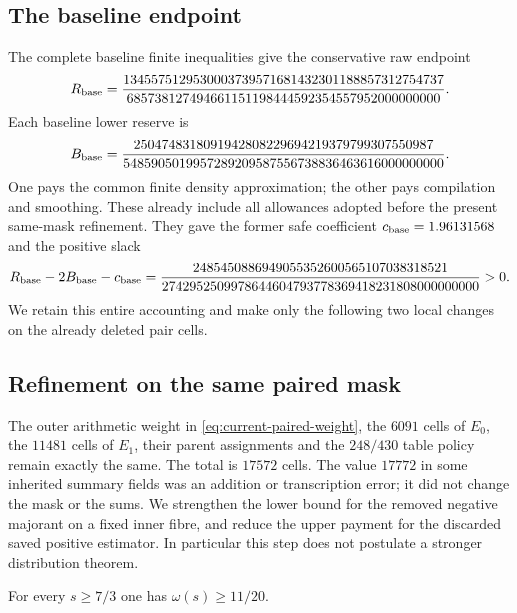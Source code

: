 \subsection{The baseline endpoint}

The complete baseline finite inequalities give the conservative raw endpoint
\begin{equation}
 R_{\rm base}=
 \frac{1345575129530003739571681432301188857312754737}
      {685738127494661151198444592354557952000000000}.
 \label{eq:base-R}
\end{equation}
Each baseline lower reserve is
\begin{equation}
 B_{\rm base}=
 \frac{2504748318091942808229694219379799307550987}
      {5485905019957289209587556738836463616000000000}.
 \label{eq:base-B}
\end{equation}
One pays the common finite density approximation; the other pays
compilation and smoothing.  These already include all allowances adopted
before the present same-mask refinement.  They gave the former safe
coefficient $c_{\rm base}=1.96131568$ and the positive slack
\begin{equation}
 R_{\rm base}-2B_{\rm base}-c_{\rm base}
 =\frac{2485450886949055352600565107038318521}
       {2742952509978644604793778369418231808000000000}>0.
 \label{eq:base-lower-slack}
\end{equation}
We retain this entire accounting and make only the following two local
changes on the already deleted pair cells.

\subsection{Refinement on the same paired mask}
\label{sec:current-refinement}

The outer arithmetic weight in \eqref{eq:current-paired-weight},
the $6091$ cells of $E_0$, the $11481$ cells of $E_1$, their parent
assignments and the $248/430$ table policy remain exactly the same.
The total is $17572$ cells.  The value $17772$ in some inherited summary
fields was an addition or transcription error; it did not change the
mask or the sums.  We strengthen the lower bound for the removed
negative majorant on a fixed inner fibre, and reduce the upper payment
for the discarded saved positive estimator.  In particular this step
does not postulate a stronger distribution theorem.

\begin{lemma}
\label{lem:current-omega-refinement}
For every $s\ge7/3$ one has $\omega(s)\ge11/20$.
\end{lemma}

